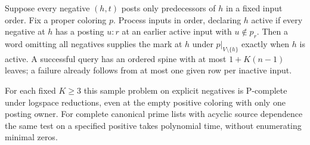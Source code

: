 \begin{theorem}
\label{core:thm:acyclic-marked-source-test}
Suppose every negative $(h,t)$ posts only predecessors of $h$ in a
fixed input order. Fix a proper coloring $p$. Process inputs in order,
declaring $h$ active if every negative at $h$ has a posting $u:r$
at an earlier active input with $u\notin p_r$.
Then a word omitting all negatives supplies the mark at $h$ under
$p|_{V\setminus\{h\}}$ exactly when $h$ is active. A successful
query has an ordered spine with at most $1+K(n-1)$ leaves; a failure
already follows from at most one given row per inactive input.

For each fixed $K\ge3$ this sample problem on explicit negatives is
$\mathrm P$-complete under logspace reductions, even at the empty
positive coloring with only one posting owner. For complete canonical
prime lists with acyclic source dependence the same test on a specified
positive takes polynomial time, without enumerating minimal zeros.
\end{theorem}
